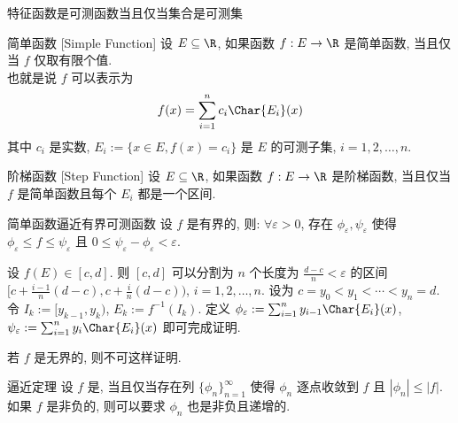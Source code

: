 \begin{ppt}
    {特征函数是可测函数当且仅当集合是可测集}
\end{ppt}
\begin{dfn}
    {简单函数}
    [Simple Function]
    设 \(E\subseteq\R\), 如果函数 \(f:E\to\R\) 是简单函数, 当且仅当 \(f\) 仅取有限个值. \\
    也就是说 \(f\) 可以表示为
    \[f(x)=\sum_{i=1}^n c_i \Char{E_i}(x)\]
    其中 \(c_i\) 是实数, \(E_i:=\{x\in E, f(x)=c_i\}\) 是 \(E\) 的可测子集, \(i=1,2,\ldots,n\). 
\end{dfn}
\begin{dfn}
    {阶梯函数}
    [Step Function]
    设 \(E\subseteq\R\), 如果函数 \(f:E\to\R\) 是阶梯函数, 当且仅当 \(f\) 是简单函数且每个 \(E_i\) 都是一个区间.
\end{dfn}
\begin{thm}
    {简单函数逼近有界可测函数}
    设 \(f\) 是有界的\MeasurableFunc{}, 则: \(\forall\varepsilon>0\), 存在\SimpleFunc{} \(\phi_\varepsilon, \psi_\varepsilon\) 使得 \(\phi_\varepsilon \leq f \leq \psi_\varepsilon\) 且 \(0 \leq\psi_\varepsilon - \phi_\varepsilon < \varepsilon\).
\end{thm}
\begin{prf}
    设 \(f(E)\in[c,d]\). 则 \([c,d]\) 可以分割为 \(n\) 个长度为 \(\frac{d-c}{n}<\varepsilon\) 的区间 \([c+\frac{i-1}{n}(d-c), c+\frac{i}{n}(d-c))\), \(i=1,2,\ldots,n\). 设为 \(c=y_0<y_1<\cdots<y_n=d\). \\
    令 \(I_k:=[y_{k-1},y_k)\), \(E_k:=f^{-1}(I_k)\). 定义 \(\phi_\varepsilon:=\sum_{i=1}^n y_{i-1} \Char{E_i}(x)\), \(\psi_\varepsilon:=\sum_{i=1}^n y_i \Char{E_i}(x)\) 即可完成证明.
\end{prf}
\begin{rmk}
    若 \(f\) 是无界的, 则不可这样证明.
\end{rmk}
\begin{thm}
    {逼近定理}
    设 \(f\) 是\MeasurableFunc{}, 当且仅当存在\SimpleFunc{}列 \(\{\phi_n\}_{n=1}^\infty\) 使得 \(\phi_n\) 逐点收敛到 \(f\) 且 \(|\phi_n|\leq |f|\). 如果 \(f\) 是非负的, 则可以要求 \(\phi_n\) 也是非负且递增的.
\end{thm}

